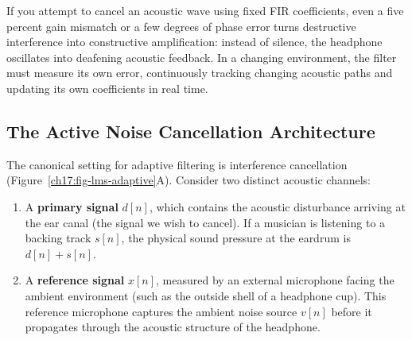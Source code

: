 If you attempt to cancel an acoustic wave using fixed FIR coefficients, even a five percent gain mismatch or a few degrees of phase error turns destructive interference into constructive amplification: instead of silence, the headphone oscillates into deafening acoustic feedback. In a changing environment, the filter must measure its own error, continuously tracking changing acoustic paths and updating its own coefficients in real time.

\subsection{The Active Noise Cancellation Architecture}
\label{ch17:anc-arch}

The canonical setting for adaptive filtering is interference cancellation (Figure~\ref{ch17:fig-lms-adaptive}A). Consider two distinct acoustic channels:
\begin{enumerate}
  \item A \textbf{primary signal} $d[n]$, which contains the acoustic disturbance arriving at the ear canal (the signal we wish to cancel). If a musician is listening to a backing track $s[n]$, the physical sound pressure at the eardrum is $d[n] + s[n]$.
  \item A \textbf{reference signal} $x[n]$, measured by an external microphone facing the ambient environment (such as the outside shell of a headphone cup). This reference microphone captures the ambient noise source $v[n]$ before it propagates through the acoustic structure of the headphone.
\end{enumerate}

